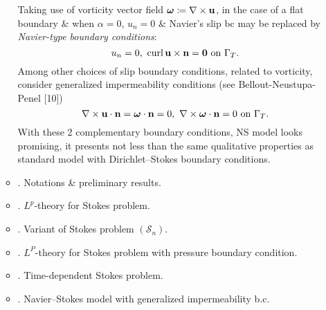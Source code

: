 \documentclass{article}
\begin{document}
\begin{enumerate}
\begin{itemize}
		Taking use of vorticity vector field $\boldsymbol{\omega}\coloneqq\nabla\times{\bf u}$, in the case of a flat boundary \& when $\alpha = 0$, $u_n = 0$ \& Navier's slip bc may be replaced by {\it Navier-type boundary conditions}:
		\begin{equation}
			u_n = 0,\ \operatorname{curl}{\bf u}\times{\bf n} = {\bf 0}\mbox{ on }\Gamma_T.
		\end{equation}
		Among other choices of slip boundary conditions, related to vorticity, consider generalized impermeability conditions (see Bellout-Neustupa-Penel [10])
		\begin{equation}
			\nabla\times{\bf u}\cdot{\bf n} = \boldsymbol{\omega}\cdot{\bf n} = 0,\ \nabla\times\boldsymbol{\omega}\cdot{\bf n} = 0\mbox{ on }\Gamma_T.
		\end{equation}
		With these 2 complementary boundary conditions, NS model looks promising, it presents not less than the same qualitative properties as standard model with Dirichlet--Stokes boundary conditions.
		
		\item {. Notations \& preliminary results.}
		\item {. $L^p$-theory for Stokes problem.}
		\item {. Variant of Stokes problem $(\mathcal{S}_n)$.}
		\item {. $L^P$-theory for Stokes problem with pressure boundary condition.}
		\item {. Time-dependent Stokes problem.}
		\item {. Navier--Stokes model with generalized impermeability b.c.}
	\end{itemize}
		

\end{enumerate}
\end{document}
